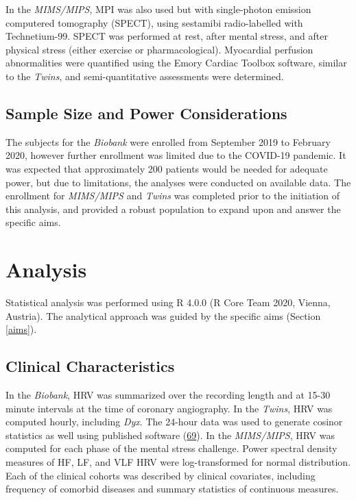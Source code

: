 \documentclass[
  11pt,
  openany]{book}
\begin{document}
In the \emph{MIMS/MIPS}, MPI was also used but with single-photon emission computered tomography (SPECT), using sestamibi radio-labelled with Technetium-99.
SPECT was performed at rest, after mental stress, and after physical stress (either exercise or pharmacological).
Myocardial perfusion abnormalities were quantified using the Emory Cardiac Toolbox software, similar to the \emph{Twins}, and semi-quantitative assessments were determined.

\hypertarget{sample-size-and-power-considerations}{%
\section{Sample Size and Power Considerations}\label{sample-size-and-power-considerations}}

The subjects for the \emph{Biobank} were enrolled from September 2019 to February 2020, however further enrollment was limited due to the COVID-19 pandemic.
It was expected that approximately 200 patients would be needed for adequate power, but due to limitations, the analyses were conducted on available data.
The enrollment for \emph{MIMS/MIPS} and \emph{Twins} was completed prior to the initiation of this analysis, and provided a robust population to expand upon and answer the specific aims.

\hypertarget{analysis}{%
\chapter{Analysis}\label{analysis}}

Statistical analysis was performed using R 4.0.0 (R Core Team 2020, Vienna, Austria).
The analytical approach was guided by the specific aims (Section \ref{aims}).

\hypertarget{clinical-characteristics}{%
\section{Clinical Characteristics}\label{clinical-characteristics}}

In the \emph{Biobank}, HRV was summarized over the recording length and at 15-30 minute intervals at the time of coronary angiography.
In the \emph{Twins}, HRV was computed hourly, including \emph{Dyx}.
The 24-hour data was used to generate cosinor statistics as well using published software (\protect\hyperlink{ref-Shah2020d}{69}).
In the \emph{MIMS/MIPS}, HRV was computed for each phase of the mental stress challenge.
Power spectral density measures of HF, LF, and VLF HRV were log-transformed for normal distribution.
Each of the clinical cohorts was described by clinical covariates, including frequency of comorbid diseases and summary statistics of continuous measures.
\end{document}
